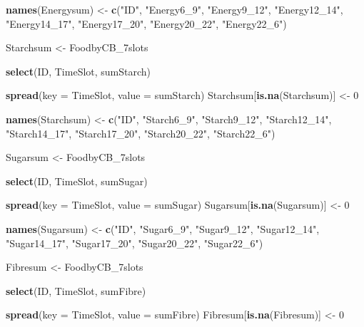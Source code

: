 \documentclass[]{article}
\newenvironment{Shaded}{\begin{snugshade}}{\end{snugshade}}
\newcommand{\KeywordTok}[1]{\textcolor[rgb]{0.12,0.11,0.11}{\textbf{#1}}}
\newcommand{\DataTypeTok}[1]{\textcolor[rgb]{0.00,0.34,0.68}{#1}}
\newcommand{\DecValTok}[1]{\textcolor[rgb]{0.69,0.50,0.00}{#1}}
\newcommand{\StringTok}[1]{\textcolor[rgb]{0.75,0.01,0.01}{#1}}
\newcommand{\OperatorTok}[1]{\textcolor[rgb]{0.12,0.11,0.11}{#1}}
\newcommand{\NormalTok}[1]{\textcolor[rgb]{0.12,0.11,0.11}{#1}}
\begin{document}
\begin{Shaded}
\begin{Highlighting}[]
{{{{{{{{{\KeywordTok{names}\NormalTok{(Energysum) <-}\StringTok{ }\KeywordTok{c}\NormalTok{(}\StringTok{"ID"}\NormalTok{, }\StringTok{"Energy6_9"}\NormalTok{, }\StringTok{"Energy9_12"}\NormalTok{, }\StringTok{"Energy12_14"}\NormalTok{, }\StringTok{"Energy14_17"}\NormalTok{,}
                     \StringTok{"Energy17_20"}\NormalTok{, }\StringTok{"Energy20_22"}\NormalTok{, }\StringTok{"Energy22_6"}\NormalTok{)}

\NormalTok{Starchsum <-}\StringTok{ }\NormalTok{FoodbyCB_7slots }\OperatorTok{%>%}\StringTok{ }
\StringTok{  }\KeywordTok{select}\NormalTok{(ID, TimeSlot, sumStarch) }\OperatorTok{%>%}\StringTok{ }
\StringTok{  }\KeywordTok{spread}\NormalTok{(}\DataTypeTok{key =}\NormalTok{ TimeSlot, }
         \DataTypeTok{value =}\NormalTok{ sumStarch)}
\NormalTok{Starchsum[}\KeywordTok{is.na}\NormalTok{(Starchsum)] <-}\StringTok{ }\DecValTok{0}


\KeywordTok{names}\NormalTok{(Starchsum) <-}\StringTok{ }\KeywordTok{c}\NormalTok{(}\StringTok{"ID"}\NormalTok{, }\StringTok{"Starch6_9"}\NormalTok{, }\StringTok{"Starch9_12"}\NormalTok{, }\StringTok{"Starch12_14"}\NormalTok{, }\StringTok{"Starch14_17"}\NormalTok{,}
                       \StringTok{"Starch17_20"}\NormalTok{, }\StringTok{"Starch20_22"}\NormalTok{, }\StringTok{"Starch22_6"}\NormalTok{)}


\NormalTok{Sugarsum <-}\StringTok{ }\NormalTok{FoodbyCB_7slots }\OperatorTok{%>%}\StringTok{ }
\StringTok{  }\KeywordTok{select}\NormalTok{(ID, TimeSlot, sumSugar) }\OperatorTok{%>%}\StringTok{ }
\StringTok{  }\KeywordTok{spread}\NormalTok{(}\DataTypeTok{key =}\NormalTok{ TimeSlot, }
         \DataTypeTok{value =}\NormalTok{ sumSugar)}
\NormalTok{Sugarsum[}\KeywordTok{is.na}\NormalTok{(Sugarsum)] <-}\StringTok{ }\DecValTok{0}


\KeywordTok{names}\NormalTok{(Sugarsum) <-}\StringTok{ }\KeywordTok{c}\NormalTok{(}\StringTok{"ID"}\NormalTok{, }\StringTok{"Sugar6_9"}\NormalTok{, }\StringTok{"Sugar9_12"}\NormalTok{, }\StringTok{"Sugar12_14"}\NormalTok{, }\StringTok{"Sugar14_17"}\NormalTok{,}
                      \StringTok{"Sugar17_20"}\NormalTok{, }\StringTok{"Sugar20_22"}\NormalTok{, }\StringTok{"Sugar22_6"}\NormalTok{)}


\NormalTok{Fibresum <-}\StringTok{ }\NormalTok{FoodbyCB_7slots }\OperatorTok{%>%}\StringTok{ }
\StringTok{  }\KeywordTok{select}\NormalTok{(ID, TimeSlot, sumFibre) }\OperatorTok{%>%}\StringTok{ }
\StringTok{  }\KeywordTok{spread}\NormalTok{(}\DataTypeTok{key =}\NormalTok{ TimeSlot, }
         \DataTypeTok{value =}\NormalTok{ sumFibre)}
\NormalTok{Fibresum[}\KeywordTok{is.na}\NormalTok{(Fibresum)] <-}\StringTok{ }\DecValTok{0}


}}}}}}}}}}}}}}}
\end{Highlighting}
\end{Shaded}
\end{document}
